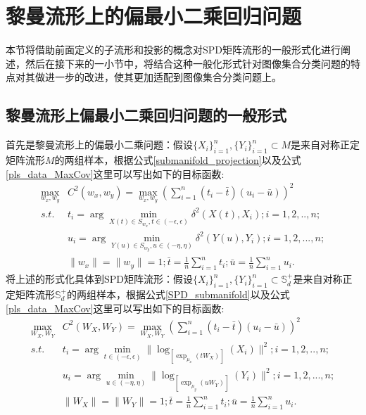 \section{黎曼流形上的偏最小二乘回归问题}
\label{sec:RPLS}
本节将借助前面定义的子流形和投影的概念对SPD矩阵流形的一般形式化进行阐述，然后在接下来的一小节中，将结合这种一般化形式针对图像集合分类问题的特点对其做进一步的改进，使其更加适配到图像集合分类问题上。
\subsection{黎曼流形上偏最小二乘回归问题的一般形式}
\label{sec:RPLS_common}
首先是黎曼流形上的偏最小二乘问题：假设$\{X_i\}_{i=1}^{n},\{Y_i\}_{i=1}^{n} \subset M$是来自对称正定矩阵流形$M$的两组样本，根据公式\ref{submanifold_projection}以及公式\ref{pls_data_MaxCov}这里可以写出如下的目标函数:
\begin{equation}
\label{Riemannian_PLS}
\begin{split}
\max_{w_x,w_y}& C^2(w_x,w_y)=\max_{w_x,w_y}{\left(\sum_{i=1}^{n}(t_i-\bar{t})(u_i-\bar{u})\right)^2}\\
s.t.~~&t_i=\arg\min_{X(t) \in S_{w_x},t \in (-\epsilon,\epsilon)}\delta^{2}(X(t),X_i);i=1,2,..,n;\\
&u_i=\arg\min_{Y(u) \in S_{w_y},u \in (-\eta,\eta)}\delta^{2}(Y(u),Y_i);i=1,2,...,n;\\
&\|w_x\|=\|w_y\|=1;\bar{t}=\frac{1}{n}\sum_{i=1}^{n}t_i;\bar{u}=\frac{1}{n}\sum_{i=1}^{n}u_i.
\end{split}
\end{equation}
将上述的形式化具体到SPD矩阵流形：假设$\{X_i\}_{i=1}^{n},\{Y_i\}_{i=1}^{n} \subset \mathbb{S}_{d}^{+}$是来自对称正定矩阵流形$\mathbb{S}_{d}^{+}$的两组样本，根据公式\ref{SPD_submanifold}以及公式\ref{pls_data_MaxCov}这里可以写出如下的目标函数:
\begin{equation}
\label{SPD_RPLS}
\begin{split}
\max_{W_X,W_Y}& C^2(W_X,W_Y)=\max_{W_X,W_Y}{\left(\sum_{i=1}^{n}(t_i-\bar{t})(u_i-\bar{u})\right)^2}\\
s.t.~~&t_i=\arg\min_{t \in (-\epsilon,\epsilon)}\|\log_{[\exp_{\mu_x}(tW_X)]}(X_i)\|^2;i=1,2,..,n;\\
&u_i=\arg\min_{u \in (-\eta,\eta)}\|\log_{[\exp_{\mu_y}(uW_Y)]}(Y_i)\|^2;i=1,2,...,n;\\
&\|W_X\|=\|W_Y\|=1;\bar{t}=\frac{1}{n}\sum_{i=1}^{n}t_i;\bar{u}=\frac{1}{n}\sum_{i=1}^{n}u_i.
\end{split}
\end{equation}

